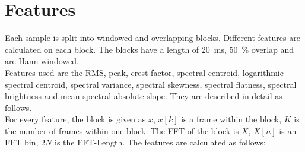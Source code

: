 \section{Features}
\label{sec:Features}
Each sample is split into windowed and overlapping blocks. Different features are calculated on each block. The blocks have a length of 20~ms, 50~\% overlap and are Hann windowed.\\
Features used are the RMS, peak, crest factor, spectral centroid, logarithmic spectral centroid, spectral variance, spectral skewness, spectral flatness, spectral brightness and mean spectral absolute slope. They are described in detail as follows.\\
For every feature, the block is given as $x$, $x[k]$ is a frame within the block, $K$ is the number of frames within one block. The FFT of the block is $X$, $X[n]$ is an FFT bin, $2 N$ is the FFT-Length. The features are calculated as follows:
